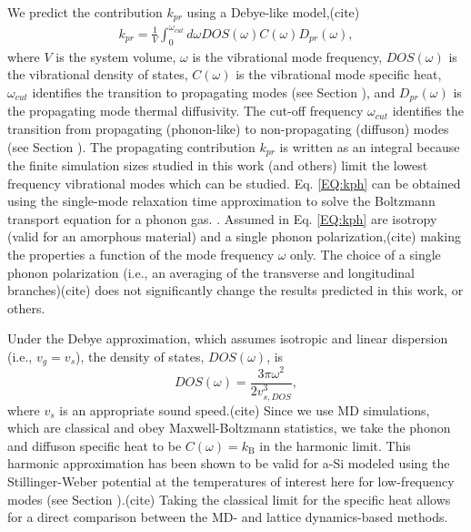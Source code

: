 \documentclass[aps,prb,twocolumn,superscriptaddress,footinbib,amsmath,amssymb,floatfix]{revtex4}
\begin{document}
We predict 
the contribution $k_{pr}$ using a Debye-like model,(cite) 
\begin{equation}\label{EQ:kph}
\begin{split}
k_{pr} = \frac{1}{V}\int_{0}^{\omega_{cut}} 
d\omega DOS(\omega) C(\omega) D_{pr}(\omega),
\end{split}
\end{equation}
where $V$ is the system volume, $\omega$ is the vibrational mode 
frequency, $DOS(\omega)$ is the vibrational 
density of states, $C(\omega)$ is the vibrational mode specific heat, 
$\omega_{cut}$ identifies the transition to propagating modes 
(see Section ), and 
$D_{pr}(\omega)$ is the propagating mode thermal diffusivity.
The cut-off frequency $\omega_{cut}$ identifies the transition from 
propagating (phonon-like) to non-propagating (diffuson) modes 
(see Section ).
\cite{feldman_thermal_1993,cahill_thermal_1994,
feldman_numerical_1999,liu_high_2009,yang_anomalously_2010}
The propagating contribution $k_{pr}$ is written as an integral because 
the finite simulation sizes studied in this work (and others)
\cite{feldman_thermal_1993,feldman_numerical_1999}
limit the lowest 
frequency vibrational modes which can be studied. 
Eq. \eqref{EQ:kph} can be obtained using the single-mode relaxation
time approximation to solve 
the Boltzmann transport equation for a phonon gas.
\cite{ziman_electrons_2001}. Assumed in Eq. \eqref{EQ:kph} 
are isotropy (valid for an amorphous material) and a single phonon 
polarization,(cite) making the  
properties a function of the mode frequency $\omega$ only. The 
choice of a single phonon polarization (i.e., an averaging 
of the transverse and longitudinal branches)(cite) does not 
significantly change 
the results predicted in this work, or others.
\cite{feldman_thermal_1993,cahill_thermal_1994,
feldman_numerical_1999,baldi_thermal_2008,liu_high_2009,
yang_anomalously_2010} 

Under the Debye approximation, 
which assumes isotropic and linear dispersion (i.e., $v_g = v_s$), 
the density of states, $DOS(\omega)$, is
\begin{equation}\label{EQ:DOS_debye}
DOS(\omega) = \frac{3\pi\omega^2}{2v_{s,DOS}^3},
\end{equation}
where $v_s$ is an appropriate sound speed.(cite) 
Since we use MD simulations, which are classical 
and obey Maxwell-Boltzmann 
statistics,\cite{mcquarrie_statistical_2000} we take the phonon and diffuson 
specific heat to be $C(\omega) = k_{\text{B}}$ in the 
harmonic limit. This harmonic approximation has been shown to be valid 
for a-Si modeled using the Stillinger-Weber potential at the temperatures of 
interest here for low-frequency modes (see Section ).(cite) 
Taking the classical limit for the specific heat allows for a direct 
comparison between 
the MD- and lattice dynamics-based methods. 
\end{document}
